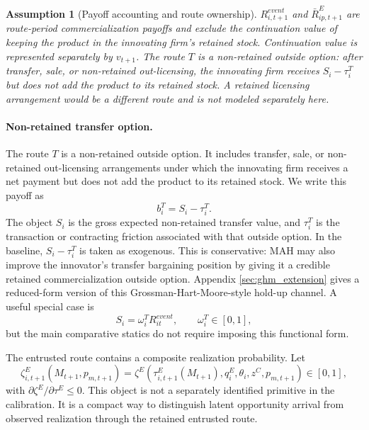 \documentclass[12pt]{article}
\newtheorem{assumption}{Assumption}
\newcommand{\1}{\mathbf{1}}
\begin{document}
\begin{assumption}[Payoff accounting and route ownership]
$R^{event}_{i,t+1}$ and $\bar R^E_{ip,t+1}$ are route-period commercialization payoffs and exclude the continuation value of keeping the product in the innovating firm's retained stock. Continuation value is represented separately by $v_{t+1}$. The route $T$ is a non-retained outside option: after transfer, sale, or non-retained out-licensing, the innovating firm receives $S_i-\tau_i^T$ but does not add the product to its retained stock. A retained licensing arrangement would be a different route and is not modeled separately here.
\end{assumption}

\paragraph{Non-retained transfer option.}
The route $T$ is a non-retained outside option. It includes transfer, sale, or non-retained out-licensing arrangements under which the innovating firm receives a net payment but does not add the product to its retained stock. We write this payoff as
\begin{equation}
    b^T_i=S_i-\tau_i^T.
    \label{eq:transfer_payoff}
\end{equation}
The object $S_i$ is the gross expected non-retained transfer value, and $\tau_i^T$ is the transaction or contracting friction associated with that outside option. In the baseline, $S_i-\tau_i^T$ is taken as exogenous. This is conservative: MAH may also improve the innovator's transfer bargaining position by giving it a credible retained commercialization outside option. Appendix \ref{sec:ghm_extension} gives a reduced-form version of this Grossman-Hart-Moore-style hold-up channel. A useful special case is
\begin{equation}
    S_i=\omega_i^T R^{event}_{it},
    \qquad
    \omega_i^T\in[0,1],
    \label{eq:transfer_special_case}
\end{equation}
but the main comparative statics do not require imposing this functional form.

The entrusted route contains a composite realization probability. Let
\begin{equation}
    \zeta^E_{i,t+1}(M_{t+1},p_{m,t+1})
    =
    \zeta^E\!\left(\tau^E_{i,t+1}(M_{t+1}),q_i^E,\theta_i,z^C,p_{m,t+1}\right)
    \in[0,1],
    \label{eq:zetaE}
\end{equation}
with $\partial\zeta^E/\partial\tau^E\le0$. This object is not a separately identified primitive in the calibration. It is a compact way to distinguish latent opportunity arrival from observed realization through the retained entrusted route.
\end{document}
